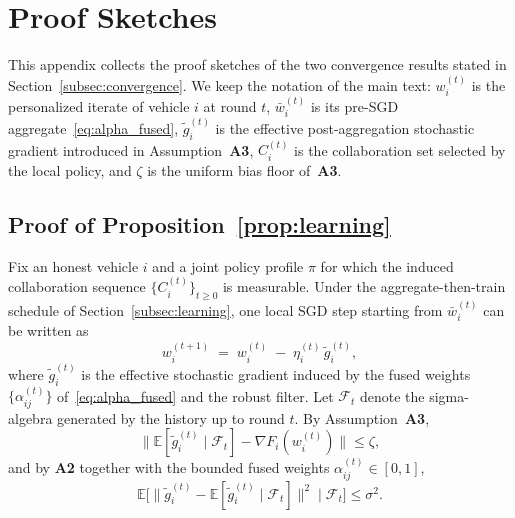 \section{Proof Sketches}
\label{app:proofs}

This appendix collects the proof sketches of the two convergence results stated in Section~\ref{subsec:convergence}. We keep the notation of the main text: $w_i^{(t)}$ is the personalized iterate of vehicle $i$ at round $t$, $\bar w_i^{(t)}$ is its pre-SGD aggregate~\eqref{eq:alpha_fused}, $\tilde g_i^{(t)}$ is the effective post-aggregation stochastic gradient introduced in Assumption~\textbf{A3}, $C_i^{(t)}$ is the collaboration set selected by the local policy, and $\zeta$ is the uniform bias floor of~\textbf{A3}.

\subsection{Proof of Proposition~\ref{prop:learning}}
\label{app:proof-learning}

Fix an honest vehicle $i$ and a joint policy profile $\pi$ for which the induced collaboration sequence $\{C_i^{(t)}\}_{t\ge 0}$ is measurable. Under the aggregate-then-train schedule of Section~\ref{subsec:learning}, one local SGD step starting from $\bar w_i^{(t)}$ can be written as
\begin{equation*}
    w_i^{(t+1)} \;=\; w_i^{(t)} \;-\; \eta_i^{(t)}\,\tilde g_i^{(t)},
\end{equation*}
where $\tilde g_i^{(t)}$ is the effective stochastic gradient induced by the fused weights $\{\alpha_{ij}^{(t)}\}$ of~\eqref{eq:alpha_fused} and the robust filter. Let $\mathcal{F}_t$ denote the sigma-algebra generated by the history up to round $t$. By Assumption~\textbf{A3},
\begin{equation*}
    \bigl\|\mathbb{E}[\tilde g_i^{(t)}\mid\mathcal{F}_t]-\nabla F_i(w_i^{(t)})\bigr\|\le\zeta,
\end{equation*}
and by \textbf{A2} together with the bounded fused weights $\alpha_{ij}^{(t)}\in[0,1]$,
\begin{equation*}
    \mathbb{E}\!\bigl[\|\tilde g_i^{(t)}-\mathbb{E}[\tilde g_i^{(t)}\mid\mathcal{F}_t]\|^2\mid\mathcal{F}_t\bigr]\le\sigma^2.
\end{equation*}

